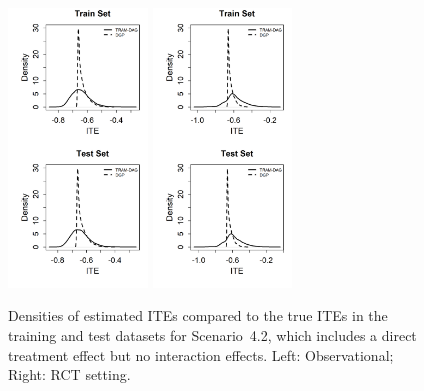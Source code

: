 \begin{figure}[htbp]
\centering
\includegraphics[width=0.33\textwidth]{img/results/observ_scenario2_ITE_densities_train_test.png}
\includegraphics[width=0.33\textwidth]{img/results/rct_scenario2_ITE_densities_train_test.png}
\vspace{-17pt}
\caption{Densities of estimated ITEs compared to the true ITEs in the training and test datasets for Scenario~4.2, which includes a direct treatment effect but no interaction effects. Left: Observational; Right: RCT setting.}
\label{fig:scenario2_ite_densities_train_test}
\end{figure}






